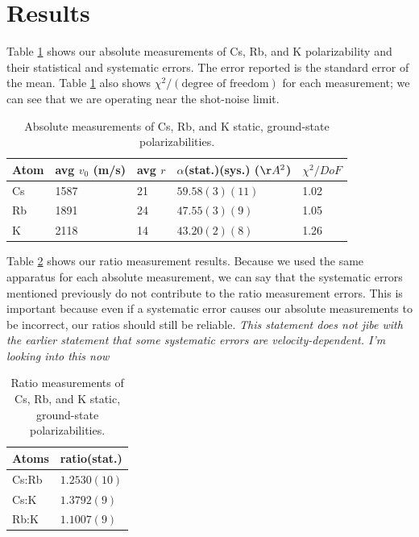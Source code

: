 \documentclass[twocolumn,prl,showpacs,superscriptaddress]{revtex4-1}   %
\newcommand{\polK}{43.20(2)(8)}
\newcommand{\polRb}{47.55(3)(9)}
\newcommand{\polCs}{59.58(3)(11)}
\newcommand{\ratRbK}{1.1007(9)}
\newcommand{\ratCsK}{1.3792(9)}
\newcommand{\ratCsRb}{1.2530(10)}
\begin{document}
\section{Results}

Table \ref{tableAbs} shows our absolute measurements of Cs, Rb, and K polarizability and their statistical and systematic errors. The error reported is the standard error of the mean. Table \ref{tableAbs} also shows $\chi^2/(\text{degree of freedom})$ for each measurement; we can see that we are operating near the shot-noise limit. 

\begingroup
\begin{table}
\caption{\label{tableAbs}Absolute measurements of Cs, Rb, and K static, ground-state polarizabilities.}
\begin{center}
\begin{tabular}{l l l l l}
\hline\hline
Atom & avg $v_0$ (m/s) & avg $r$ & $\alpha$(stat.)(sys.) ($\AA^2$) & $\chi^2/DoF$ \\
\hline
Cs & 1587 & 21 & $\polCs$ & 1.02 \\
Rb & 1891 & 24 & $\polRb$ & 1.05 \\
K  & 2118 & 14 & $\polK$ & 1.26 \\
\hline\hline
\end{tabular}
\end{center}
\end{table}
\endgroup

Table \ref{tableRatio} shows our ratio measurement results. Because we used the same apparatus for each absolute measurement, we can say that the systematic errors mentioned previously do not contribute to the ratio measurement errors. This is important because even if a systematic error causes our absolute measurements to be incorrect, our ratios should still be reliable. \textit{This statement does not jibe with the earlier statement that some systematic errors are velocity-dependent. I'm looking into this now} 

\begingroup
\begin{table}
\caption{\label{tableRatio}Ratio measurements of Cs, Rb, and K static, ground-state polarizabilities.}
\begin{center}
\begin{tabular}{l l}
\hline\hline
Atoms & ratio(stat.) \\
\hline
Cs:Rb & $\ratCsRb$ \\
Cs:K  & $\ratCsK$ \\
Rb:K  & $\ratRbK$ \\
\hline\hline
\end{tabular}
\end{center}
\end{table}
\endgroup
\end{document}

